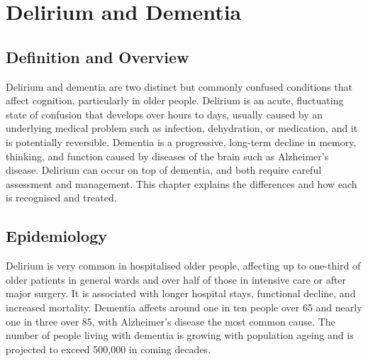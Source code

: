 \chapter{Delirium and Dementia}

\section*{Definition and Overview}
Delirium and dementia are two distinct but commonly confused conditions that affect cognition, particularly in older people. Delirium is an acute, fluctuating state of confusion that develops over hours to days, usually caused by an underlying medical problem such as infection, dehydration, or medication, and it is potentially reversible. Dementia is a progressive, long-term decline in memory, thinking, and function caused by diseases of the brain such as Alzheimer's disease. Delirium can occur on top of dementia, and both require careful assessment and management. This chapter explains the differences and how each is recognised and treated.

\section*{Epidemiology}
Delirium is very common in hospitalised older people, affecting up to one-third of older patients in general wards and over half of those in intensive care or after major surgery. It is associated with longer hospital stays, functional decline, and increased mortality. Dementia affects around one in ten people over 65 and nearly one in three over 85, with Alzheimer's disease the most common cause. The number of people living with dementia is growing with population ageing and is projected to exceed 500,000 in coming decades.


